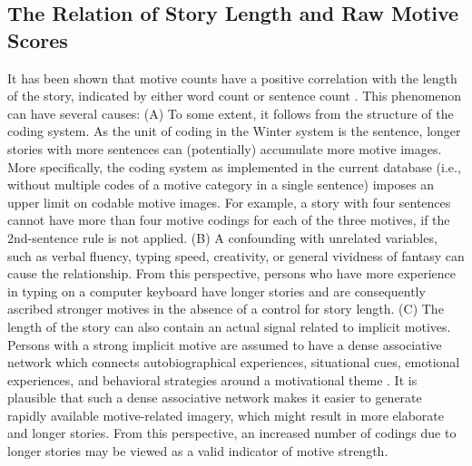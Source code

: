 \documentclass[man,a4paper,mask]{apa6}\usepackage[]{graphicx}\usepackage[]{color}
\begin{document}
\subsection{The Relation of Story Length and Raw Motive Scores}

It has been shown that motive counts have a positive correlation with the length of the story, indicated by either word count or sentence count \parencite{pang_ContentCodingMethods_2010,schultheiss_MeasuringImplicitMotives_2007}. This phenomenon can have several causes: (A) To some extent, it follows from the structure of the coding system. As the unit of coding in the Winter system is the sentence, longer stories with more sentences can (potentially) accumulate more motive images. More specifically, the coding system as implemented in the current database (i.e., without multiple codes of a motive category in a single sentence) imposes an upper limit on codable motive images. For example, a story with four sentences cannot have more than four motive codings for each of the three motives, if the 2nd-sentence rule is not applied.
(B) A confounding with unrelated variables, such as verbal fluency, typing speed, creativity, or general vividness of fantasy can cause the relationship. From this perspective, persons who have more experience in typing on a computer keyboard have longer stories and are consequently ascribed stronger motives in the absence of a control for story length.
(C) The length of the story can also contain an actual signal related to implicit motives. Persons with a strong implicit motive are assumed to have a dense associative network which connects autobiographical experiences, situational cues, emotional experiences, and behavioral strategies around a motivational theme \parencite{schultheiss_reliability_2008,mcclelland_human_1987}. It is plausible that such a dense associative network makes it easier to generate rapidly available motive-related imagery, which might result in more elaborate and longer stories. From this perspective, an increased number of codings due to longer stories may be viewed as a valid indicator of motive strength.
\end{document}

